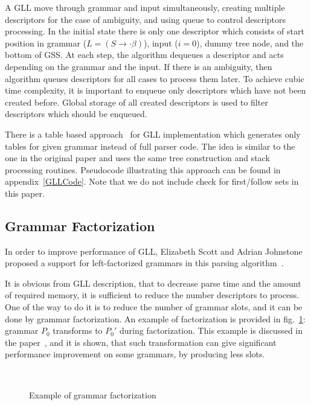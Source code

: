 \documentclass[runningheads,a4paper]{llncs}
\begin{document}
A GLL move through grammar and input simultaneously, creating multiple descriptors for the case of ambiguity, and using queue to control descriptors processing.
In the initial state there is only one descriptor which consists of start position in grammar ($L = (S \to \cdot \beta)$), input ($i=0$), dummy tree node, and the bottom of GSS.
At each step, the algorithm dequeues a descriptor and acts depending on the grammar and the input.
If there is an ambiguity, then algorithm queues descriptors for all cases to process them later. 
To achieve cubic time complexity, it is important to enqueue only descriptors which have not been created before.
Global storage of all created descriptors is used to filter descriptors which should be enqueued.

There is a table based approach~\cite{ragozina} for GLL implementation which generates only tables for given grammar instead of full parser code.
The idea is similar to the one in the original paper and uses the same tree construction and stack processing routines.
Pseudocode illustrating this approach can be found in appendix~\ref{GLLCode}.
Note that we do not include check for first/follow sets in this paper.


\subsection{Grammar Factorization}%

In order to improve performance of GLL, Elizabeth Scott and Adrian Johnstone proposed a support for left-factorized grammars in this parsing algorithm~\cite{scott2016structuring}. 

It is obvious from GLL description, that to decrease parse time and the amount of required memory, it is sufficient to reduce the number descriptors to process.
One of the way to do it is to reduce the number of grammar slots, and it can be done by grammar factorization.
An example of factorization is provided in fig.~\ref{fig:ExampleOfFactorization}: grammar $P_0$ transforms to $P_0'$ during factorization.
This example is discussed in the paper~\cite{scott2016structuring}, and it is shown, that such transformation can give significant performance improvement on some grammars, by producing less slots.

\begin{figure}
    \centering
    ~
    \caption{Example of grammar factorization}
    \label{fig:ExampleOfFactorization}
\end{figure}
\end{document}
